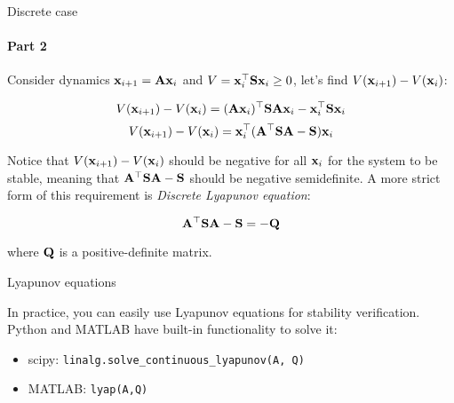 \documentclass{beamer}
\begin{document}
\begin{frame}{Discrete case}
\framesubtitle{Part 2}
\begin{flushleft}

Consider dynamics $\mathbf{x}_{i+1} = \mathbf{A}\mathbf{x}_i$ and $V = \mathbf{x}_i^\top\mathbf{S}\mathbf{x}_i \geq 0$, let's find $V(\mathbf{x}_{i+1}) - V(\mathbf{x}_i)$:

\begin{equation}
    V(\mathbf{x}_{i+1}) - V(\mathbf{x}_i) = (\mathbf{A}\mathbf{x}_i)^\top\mathbf{S}\mathbf{A}\mathbf{x}_i - 
    \mathbf{x}_i^\top\mathbf{S}\mathbf{x}_i
\end{equation}
\begin{equation}
    V(\mathbf{x}_{i+1}) - V(\mathbf{x}_i) = \mathbf{x}_i^\top(\mathbf{A}^\top\mathbf{S}\mathbf{A} - \mathbf{S})\mathbf{x}_i
\end{equation}

Notice that $V(\mathbf{x}_{i+1}) - V(\mathbf{x}_i)$ should be negative for all $\mathbf{x}_i$ for the system to be stable, meaning that $\mathbf{A}^\top\mathbf{S}\mathbf{A} - \mathbf{S}$ should be negative semidefinite. A more strict form of this requirement is \emph{Discrete Lyapunov equation}:

\begin{equation}
    \mathbf{A}^\top\mathbf{S}\mathbf{A} - \mathbf{S} = -\mathbf{Q}
\end{equation}

where $\mathbf{Q}$ is a positive-definite matrix.

\end{flushleft}
\end{frame}






\begin{frame}{Lyapunov equations}
\begin{flushleft}

In practice, you can easily use Lyapunov equations for stability verification. Python and MATLAB have built-in functionality to solve it:

\begin{itemize}
    \item scipy: \texttt{linalg.solve\_continuous\_lyapunov(A, Q)}
    \item MATLAB: \texttt{lyap(A,Q)}
\end{itemize}

\end{flushleft}
\end{frame}
\end{document}
